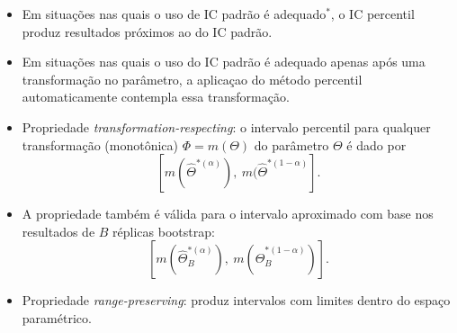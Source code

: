 \documentclass[
  letterpaper,
  DIV=11,
  numbers=noendperiod]{scrreprt}
\begin{document}
\begin{tcolorbox}[enhanced jigsaw, left=2mm, toprule=.15mm, opacityback=0, title=\textcolor{quarto-callout-note-color}{\faInfo}\hspace{0.5em}{Nota}, leftrule=.75mm, breakable, colbacktitle=quarto-callout-note-color!10!white, coltitle=black, rightrule=.15mm, bottomtitle=1mm, toptitle=1mm, colframe=quarto-callout-note-color-frame, colback=white, opacitybacktitle=0.6, bottomrule=.15mm, arc=.35mm, titlerule=0mm]

\begin{itemize}
\item
  Em situações nas quais o uso de IC padrão é adequado\(^*\), o IC
  percentil produz resultados próximos ao do IC padrão.
\item
  Em situações nas quais o uso do IC padrão é adequado apenas após uma
  transformação no parâmetro, a aplicaçao do método percentil
  automaticamente contempla essa transformação.
\end{itemize}

\end{tcolorbox}

\begin{tcolorbox}[enhanced jigsaw, left=2mm, toprule=.15mm, opacityback=0, title=\textcolor{quarto-callout-tip-color}{\faLightbulb}\hspace{0.5em}{Considerações Finais}, leftrule=.75mm, breakable, colbacktitle=quarto-callout-tip-color!10!white, coltitle=black, rightrule=.15mm, bottomtitle=1mm, toptitle=1mm, colframe=quarto-callout-tip-color-frame, colback=white, opacitybacktitle=0.6, bottomrule=.15mm, arc=.35mm, titlerule=0mm]

\begin{itemize}
\item
  Propriedade \textit{transformation-respecting}: o intervalo percentil
  para qualquer transformação (monotônica) \(\Phi=m(\Theta)\) do
  parâmetro \(\Theta\) é dado por
  \[\left[ m(\hat\Theta^{*(\alpha)}), \ m(\hat\Theta^{*(1-\alpha)}\right].\]
\item
  A propriedade também é válida para o intervalo aproximado com base nos
  resultados de \(B\) réplicas bootstrap:
  \[\left[ m(\hat\Theta_B^{*(\alpha)}), \ m(\hat\Theta_B^{*(1-\alpha)})\right].\]
\item
  Propriedade \emph{range-preserving}: produz intervalos com limites
  dentro do espaço paramétrico.
\end{itemize}

\end{tcolorbox}
\end{document}

